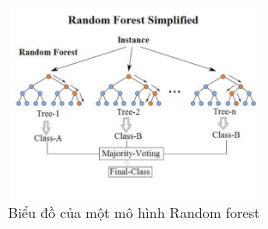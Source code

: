 \begin{figure}[h!]
    \centering
    \includegraphics[width=0.6\textwidth]{figures/Random_forest_diagram_complete.png} %
    \caption{Biểu đồ của một mô hình Random forest} %
    \label{fig:1} %
\end{figure}

